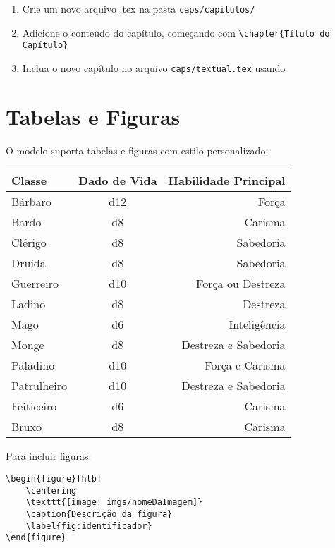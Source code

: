 \begin{rpgtable}
\begin{enumerate}
    \item Crie um novo arquivo .tex na pasta \texttt{caps/capitulos/}
    \item Adicione o conteúdo do capítulo, começando com \verb|\chapter{Título do Capítulo}|
    \item Inclua o novo capítulo no arquivo \texttt{caps/textual.tex} usando \verb||
\end{enumerate}
\end{rpgtable}

\section{Tabelas e Figuras}

O modelo suporta tabelas e figuras com estilo personalizado:

\begin{rpgtable}
\begin{tabular}{lcr}
\toprule
\textbf{Classe} & \textbf{Dado de Vida} & \textbf{Habilidade Principal} \\
\midrule
Bárbaro & d12 & Força \\
Bardo & d8 & Carisma \\
Clérigo & d8 & Sabedoria \\
Druida & d8 & Sabedoria \\
Guerreiro & d10 & Força ou Destreza \\
Ladino & d8 & Destreza \\
Mago & d6 & Inteligência \\
Monge & d8 & Destreza e Sabedoria \\
Paladino & d10 & Força e Carisma \\
Patrulheiro & d10 & Destreza e Sabedoria \\
Feiticeiro & d6 & Carisma \\
Bruxo & d8 & Carisma \\
\bottomrule
\end{tabular}
\end{rpgtable}

Para incluir figuras:

\begin{quotebox}
\verb|\begin{figure}[htb]|\\
\verb|    \centering|\\
\verb|    \texttt{[image: imgs/nomeDaImagem]}|\\
\verb|    \caption{Descrição da figura}|\\
\verb|    \label{fig:identificador}|\\
\verb|\end{figure}|
\end{quotebox}

